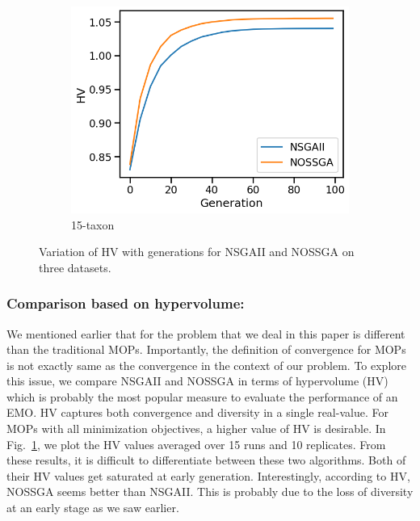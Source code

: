 \begin{figure}[!htbp]
\begin{adjustwidth}{-1cm}{-1cm}
\begin{subfigure}[b]{0.4\textwidth}
			\includegraphics[width=\textwidth]{Figure/15-taxon_hv}
			\caption{15-taxon}
		\end{subfigure}
		\caption{Variation of HV with generations for NSGAII and NOSSGA on three datasets.}
		\label{fig:gen_wise_hv}
	\end{adjustwidth}
\end{figure}

\subsubsection{Comparison based on hypervolume:} We mentioned earlier that for the problem that we deal in this paper is different than the traditional MOPs. Importantly, the definition of convergence for MOPs is not exactly same as the convergence in the context of our problem. To explore this issue, we compare NSGAII and NOSSGA in terms of hypervolume (HV)~\cite{zitzler1999multiobjective} which is probably the most popular measure to evaluate the performance of an EMO. HV captures both convergence and diversity in a single real-value. For MOPs with all minimization objectives, a higher value of HV is desirable. In Fig.~\ref{fig:gen_wise_hv}, we plot the HV values averaged over 15 runs and 10 replicates. From these results, it is difficult to differentiate between these two algorithms. Both of their HV values get saturated at early generation. Interestingly, according to HV, NOSSGA seems better than NSGAII. This is probably due to the loss of diversity at an early stage as we saw earlier. 

